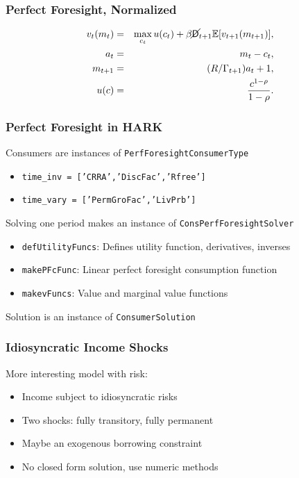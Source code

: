 \documentclass[11pt]{cfpbpresentation}
\newcommand{\E}{\mathbb{E}}
\newcommand{\Die}{\mathsf{D}}
\newcommand{\Live}{\cancel{\Die}}
\begin{document}
\begin{frame}
\frametitle{Perfect Foresight, Normalized}

\begin{eqnarray*}
v_t(m_t) &=& \max_{c_t} u(c_t) + \beta \Live_{t+1} \E [v_{t+1}(m_{t+1}) ], \\
a_t &=& m_t - c_t, \\
m_{t+1} &=& (R/\Gamma_{t+1}) a_t + 1, \\
u(c) &=& \frac{c^{1-\rho}}{1-\rho}.
\end{eqnarray*}
\end{frame}


\begin{frame}
\frametitle{Perfect Foresight in HARK}
Consumers are instances of \texttt{PerfForesightConsumerType}
\begin{itemize}
\item \texttt{time\_inv = ['CRRA','DiscFac','Rfree']}

\item \texttt{time\_vary = ['PermGroFac','LivPrb']}
\end{itemize}

Solving one period makes an instance of \texttt{ConsPerfForesightSolver}
\begin{itemize}
\item \texttt{defUtilityFuncs}: Defines utility function, derivatives, inverses

\item \texttt{makePFcFunc}: Linear perfect foresight consumption function

\item \texttt{makevFuncs}: Value and marginal value functions
\end{itemize}

Solution is an instance of \texttt{ConsumerSolution}
\end{frame}


\begin{frame}
\frametitle{Idiosyncratic Income Shocks}
More interesting model with risk:
\begin{itemize}
\item Income subject to idiosyncratic risks

\item Two shocks: fully transitory, fully permanent

\item Maybe an exogenous borrowing constraint

\item No closed form solution, use numeric methods
\end{itemize}
\end{frame}
\end{document}
